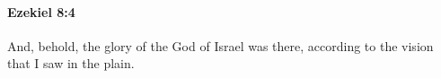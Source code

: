 
		\paragraph{Ezekiel 8:4} %
			\label{EZEKIEL-8-4}

			And, behold, the glory of the God of Israel was there, according to the vision that I saw in the plain.


